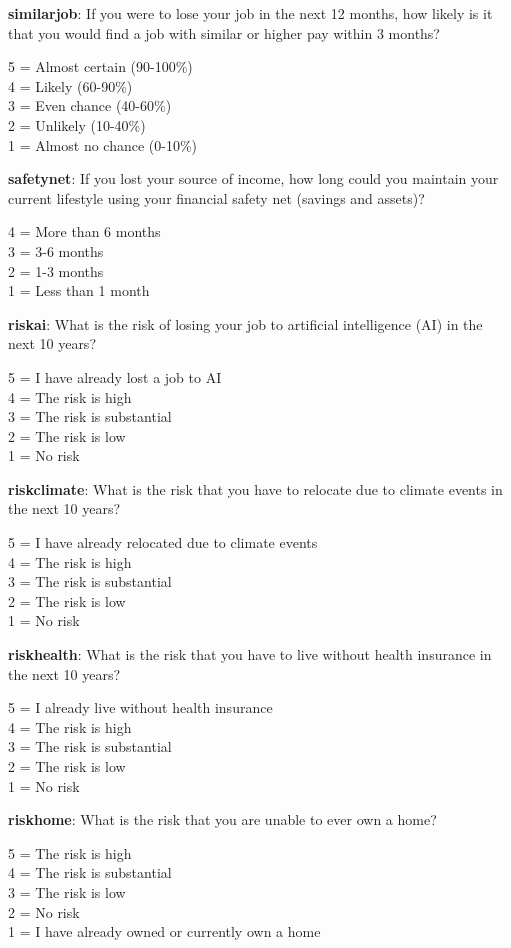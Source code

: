 \documentclass[11pt, headsepline]{article}
\begin{document}
\textbf{similarjob}: If you were to lose your job in the next 12 months, how likely is it that you would find a job with similar or higher pay within 3 months?

5 = Almost certain (90-100\%) \\
4 = Likely (60-90\%) \\
3 = Even chance (40-60\%) \\
2 = Unlikely (10-40\%) \\
1 = Almost no chance (0-10\%)

\textbf{safetynet}: If you lost your source of income, how long could you maintain your current lifestyle using your financial safety net (savings and assets)?

4 = More than 6 months \\
3 = 3-6 months \\
2 = 1-3 months \\
1 = Less than 1 month 

\textbf{riskai}: What is the risk of losing your job to artificial intelligence (AI) in the next 10 years?

5 = I have already lost a job to AI \\
4 = The risk is high \\
3 = The risk is substantial \\
2 = The risk is low \\
1 = No risk

\textbf{riskclimate}: What is the risk that you have to relocate due to climate events in the next 10 years?

5 = I have already relocated due to climate events \\
4 = The risk is high \\
3 = The risk is substantial \\
2 = The risk is low \\
1 = No risk

\textbf{riskhealth}: What is the risk that you have to live without health insurance in the next 10 years?

5 = I already live without health insurance \\
4 = The risk is high \\
3 = The risk is substantial \\
2 = The risk is low \\
1 = No risk

\textbf{riskhome}: What is the risk that you are unable to ever own a home?

5 = The risk is high \\
4 = The risk is substantial \\
3 = The risk is low \\
2 = No risk \\
1 = I have already owned or currently own a home
\end{document}
